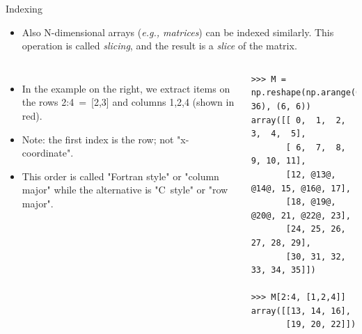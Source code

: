 \documentclass[10pt, aspectratio=169]{beamer} %
\begin{document}
\begin{frame}[fragile,allowframebreaks=0.8]
 {Indexing}
\begin{itemize}
\item Also N-dimensional arrays (\emph{e.g., matrices}) can be indexed similarly. This operation is called \emph{slicing},
and the result is a \emph{slice} of the matrix.
\end{itemize}
\vspace*{-0.2cm}
\begin{columns}
\hspace*{0.05cm}
\begin{itemize}
\item In the example on the right, we extract items on the rows 2:4~=~[2,3] and columns 1,2,4 (shown in red).
\item Note: the first index is the row; not "x-coordinate".
\item This order is called "Fortran style" or "column major" while the alternative is 
"C~style" or "row major".
\end{itemize}
\begin{lstlisting}
>>> M = np.reshape(np.arange(0, 36), (6, 6))
array([[ 0,  1,  2,  3,  4,  5],
       [ 6,  7,  8,  9, 10, 11],
       [12, @13@, @14@, 15, @16@, 17],
       [18, @19@, @20@, 21, @22@, 23],
       [24, 25, 26, 27, 28, 29],
       [30, 31, 32, 33, 34, 35]])

>>> M[2:4, [1,2,4]]
array([[13, 14, 16],
       [19, 20, 22]])
\end{lstlisting}
\end{columns}
\end{frame}
\end{document}
